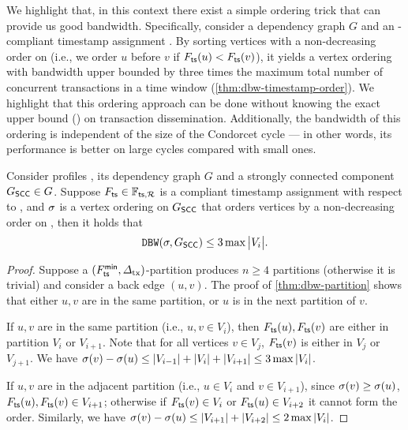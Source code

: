 We highlight that, in this context there exist a simple ordering trick that can provide us good bandwidth.
%
Specifically, consider a dependency graph $G$ and an \profileSet-compliant timestamp assignment \mapTimestamp.
%
By sorting vertices with a non-decreasing order on \mapTimestamp (i.e., we order $u$ before $v$ if $F_{\mathsf{ts}}(u) < F_{\mathsf{ts}}(v)$), it yields a vertex ordering with bandwidth upper bounded by three times the maximum total number of concurrent transactions in a \txDelay time window (\cref{thm:dbw-timestamp-order}).
%
We highlight that this ordering approach can be done without knowing the exact upper bound (\txDelay) on transaction dissemination.
%
Additionally, the bandwidth of this ordering is independent of the size of the Condorcet cycle --- in other words, its performance is better on large cycles compared with small ones.

\begin{theorem} \label{thm:dbw-timestamp-order}
    Consider profiles \profileSet, its dependency graph $G$ and a strongly connected component $G_\mathsf{SCC} \in G$.
    Suppose $F_{\mathsf{ts}} \in \mathbb{F}_{\mathsf{ts}, \mathcal{R}}$ is a compliant timestamp assignment with respect to \profileSet, and $\sigma$ is a vertex ordering on $G_\mathsf{SCC}$ that orders vertices by a non-decreasing order on \mapTimestamp, then it holds that
    \[ \mathtt{DBW}(\sigma, G_\mathsf{SCC}) \le 3 \max \big| V_i \big|. \]
\end{theorem}

\begin{proof}
    Suppose a $(F^{\mathsf{min}}_{\mathsf{ts}}, \varDelta_{\mathrm{tx}})$-partition produces $n \ge 4$ partitions (otherwise it is trivial) and consider a back edge $(u, v)$.
    The proof of \cref{thm:dbw-partition} shows that either $u, v$ are in the same partition, or $u$ is in the next partition of $v$.

    If $u, v$ are in the same partition (i.e., $u, v \in V_i$), then $F_{\mathsf{ts}}(u), F_{\mathsf{ts}}(v)$ are either in partition $V_i$ or $V_{i + 1}$.
    Note that for all vertices $v \in V_j$, $F_{\mathsf{ts}}(v)$ is either in $V_j$ or $V_{j + 1}$.
    We have $\sigma(v) - \sigma(u) \le |V_{i - 1}| + |V_i| + |V_{i + 1}| \le 3 \max |V_i|$.

    If $u ,v$ are in the adjacent partition (i.e., $u \in V_i$ and $v \in V_{i + 1}$), since $\sigma(v) \ge \sigma(u)$, $F_{\mathsf{ts}}(u), F_{\mathsf{ts}}(v) \in V_{i + 1}$; otherwise if $F_{\mathsf{ts}}(v) \in V_i$ or $F_{\mathsf{ts}}(u) \in V_{i + 2}$ it cannot form the order.
    Similarly, we have $\sigma(v) - \sigma(u) \le |V_{i + 1}| + |V_{i + 2}| \le 2 \max |V_i|$.
\end{proof}

